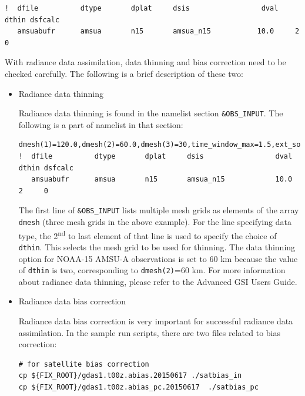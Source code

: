 \begin{scriptsize}
\begin{verbatim}
!  dfile          dtype       dplat     dsis                 dval    dthin dsfcalc
   amsuabufr      amsua       n15       amsua_n15           10.0     2     0
\end{verbatim}
\end{scriptsize}

With radiance data assimilation, data thinning and bias correction need to be checked carefully. The following is a brief description of these two:

\begin{itemize}
\item Radiance data thinning

Radiance data thinning is found in the namelist section \verb|&OBS_INPUT|. The following is a part of namelist in that section:

\begin{scriptsize}
\begin{verbatim}
dmesh(1)=120.0,dmesh(2)=60.0,dmesh(3)=30,time_window_max=1.5,ext_sonde=.true.
!  dfile          dtype       dplat     dsis                 dval    dthin dsfcalc
   amsuabufr      amsua       n15       amsua_n15            10.0     2     0
\end{verbatim}
\end{scriptsize}

The first line of \verb|&OBS_INPUT| lists multiple mesh grids as elements of the array \verb|dmesh| (three mesh grids in the above example). For the line specifying data type, the 2\textsuperscript{nd} to last element of that line is used to specify the choice of \verb|dthin|. This selects the mesh grid to be used for thinning. The data thinning option for NOAA-15 AMSU-A observations is set to 60 km because the value of \verb|dthin| is two, corresponding to \verb|dmesh(2)|=60 km.  For more information about radiance data thinning, please refer to the Advanced GSI User\textquotesingle s Guide.\\

\item Radiance data bias correction

Radiance data bias correction is very important for successful radiance data assimilation.  In the sample run scripts, there are two files related to bias correction:

\begin{scriptsize}
\begin{verbatim}
# for satellite bias correction
cp ${FIX_ROOT}/gdas1.t00z.abias.20150617 ./satbias_in
cp ${FIX_ROOT}/gdas1.t00z.abias_pc.20150617  ./satbias_pc
\end{verbatim}
\end{scriptsize}


\end{itemize}

